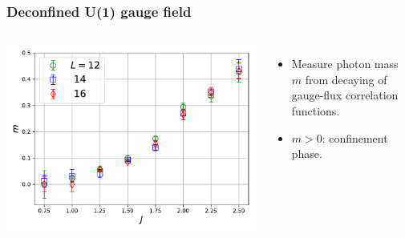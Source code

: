 \documentclass[xcolor=table, 10pt, aspectratio=169]{beamer}
\begin{document}
\begin{frame}
  \frametitle{Deconfined U(1) gauge field}
  \begin{columns}
    \includegraphics[width=\textwidth]{photonmass}
		\begin{itemize}
			\item Measure photon mass $m$ from decaying of gauge-flux correlation functions.
			\item $m > 0$: confinement phase.
		\end{itemize}
  \end{columns}
\end{frame}
\end{document}
